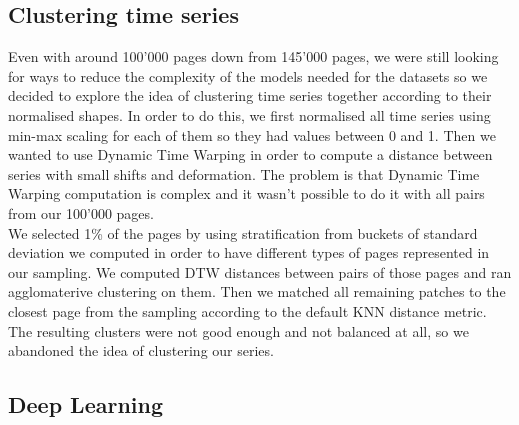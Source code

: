 \documentclass[11pt]{article}
\begin{document}
    \subsection{Clustering time series}
    Even with around 100'000 pages down from 145'000 pages, we were still looking for ways to reduce the complexity of the models needed for the datasets so we decided to explore the idea of clustering time series together according to their normalised shapes. In order to do this, we first normalised all time series using min-max scaling for each of them so they had values between 0 and 1. Then we wanted to use Dynamic Time Warping in order to compute a distance between series with small shifts and deformation. The problem is that Dynamic Time Warping computation is complex and it wasn't possible to do it with all pairs from our 100'000 pages.\\

    We selected 1\% of the pages by using stratification from buckets of standard deviation we computed in order to have different types of pages represented in our sampling. We computed DTW distances between pairs of those pages and ran agglomaterive clustering on them. Then we matched all remaining patches to the closest page from the sampling according to the default KNN distance metric.\\

    The resulting clusters were not good enough and not balanced at all, so we abandoned the idea of clustering our series.
    \subsection{Deep Learning}
\end{document}
